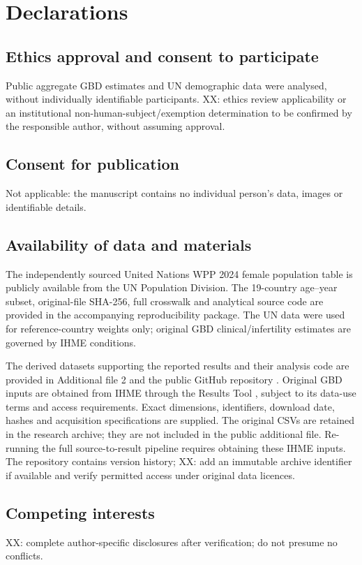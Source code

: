 \documentclass[11pt,a4paper]{article}
\begin{document}
\section*{Declarations}
\subsection*{Ethics approval and consent to participate}
Public aggregate GBD estimates and UN demographic data were analysed, without individually identifiable participants. XX: ethics review applicability or an institutional non-human-subject/exemption determination to be confirmed by the responsible author, without assuming approval.
\subsection*{Consent for publication}
Not applicable: the manuscript contains no individual person's data, images or identifiable details.
\subsection*{Availability of data and materials}
The independently sourced United Nations WPP 2024 female population table is publicly available from the UN Population Division. The 19-country age--year subset, original-file SHA-256, full crosswalk and analytical source code are provided in the accompanying reproducibility package. The UN data were used for reference-country weights only; original GBD clinical/infertility estimates are governed by IHME conditions.

The derived datasets supporting the reported results and their analysis code are provided in Additional file 2 and the public GitHub repository \cite{repository}. Original GBD inputs are obtained from IHME through the Results Tool \cite{results}, subject to its data-use terms and access requirements. Exact dimensions, identifiers, download date, hashes and acquisition specifications are supplied. The original CSVs are retained in the research archive; they are not included in the public additional file. Re-running the full source-to-result pipeline requires obtaining these IHME inputs. The repository contains version history; XX: add an immutable archive identifier if available and verify permitted access under original data licences.
\subsection*{Competing interests}
XX: complete author-specific disclosures after verification; do not presume no conflicts.
\end{document}
